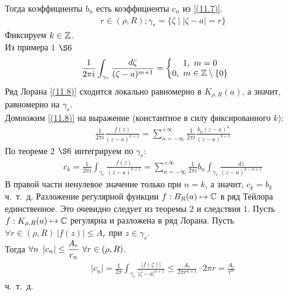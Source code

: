 Тогда коэффициенты $b_n$ есть коэффициенты $c_n$ из \eqref{(11.7)}.
\pr
\begin{align*}
  & r \in (\rho, R); \gamma_r = \{\zeta \mid \left| \zeta - a \right| = r\}
\end{align*}
Фиксируем $k \in \mathbb{Z}$.
\\
Из примера $1$ $\S6$
\begin{align*}
  & \frac{1}{2 \pi i} \int_{\gamma_r}\frac{d\zeta}{(\zeta - a)^{m+1}} = \left\{ \begin{matrix}
          1, \ m = 0 \\
          0, \ m \in \mathbb{Z} \setminus\{0\}
      \end{matrix} \right.
\end{align*}
Ряд Лорана \eqref{(11.8)} сходится локально равномерно в $K_{\rho,R}(a)$,
а значит, равномерно на $\gamma_r$.
\\
Домножим \eqref{(11.8)} на выражение (константное в силу фиксированного
$k$):
\begin{align*}
  & \frac{1}{2\pi i}\frac{f(z)}{(z-a)^{k+1}} = \sum_{n = -\infty}^{+\infty} \frac{1}{2 \pi i}\frac{b_n(z-a)^n}{(z-a)^{k+1}}
\end{align*}
По теореме $2$ $\S 6$ интегрируем по $\gamma_r$:
\begin{align*}
  & c_k = \frac{1}{2 \pi i} \int_{\gamma_r}\frac{f(z)}{(z - a)^{k+1}} = \sum_{n = -\infty}^{+\infty} \frac{1}{2\pi i}b_n \int_{\gamma_r}\frac{dz}{(z-a)^{k-n+1}}
\end{align*}
В правой части ненулевое значение только при $n=k$, а значит, $c_k = b_k$
\\
ч.~т.~д.
\corollary
Разложение регулярной функции $f: B_R(a) \mapsto \mathbb{C}$ в ряд Тейлора
единственное.
\pr
Это очевидно следует из теоремы $2$ и следствия $1$.
\corollary
Пусть $f:K_{\rho,R}(a) \mapsto \mathbb{C}$ регулярна и разложена в ряд Лорана. Пусть
$\forall r \in (\rho, R) \ \left| f(z) \right|\leq A_r$ при $z \in \gamma_r$.
\\
Тогда $\forall n \ \left| c_n \right| \leq \displaystyle \frac{A_r}{r_n} \ \forall r \in
(\rho, R)$.
\pr
\begin{align*}
  & \left| c_n \right| = \frac{1}{2 \pi} \int_{\gamma_r}\frac{\left| f(\zeta) \right|}{\left| \zeta - a \right|^{n+1}} \leq \frac{A_r}{2 \pi r^{n+1}} \cdot 2 \pi r = \frac{A_r}{r^n}
\end{align*}
ч.~т.~д.
